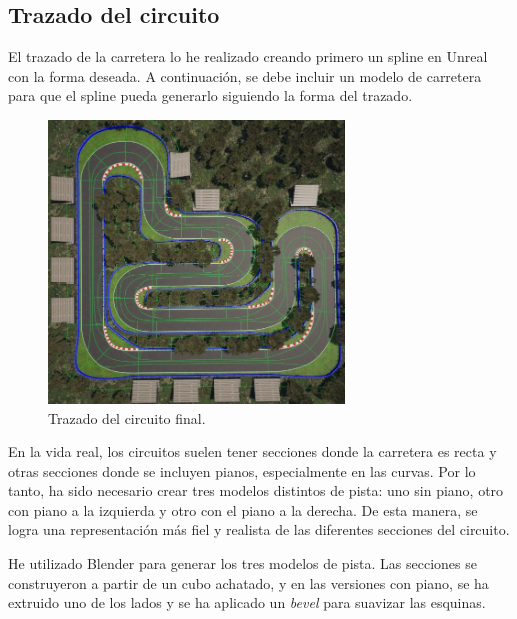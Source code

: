 \subsection{Trazado del circuito}

El trazado de la carretera lo he realizado creando primero un spline en Unreal con la forma deseada. A continuación, se debe incluir un modelo de carretera para que el spline pueda generarlo siguiendo la forma del trazado.
\begin{figure}[H]
    \centering
    \includegraphics[width=0.7\textwidth]{imagenes/converted/trazadoFinal.jpg}
    \caption{Trazado del circuito final.}
    \label{fig:trazado}
\end{figure}


En la vida real, los circuitos suelen tener secciones donde la carretera es recta y otras secciones donde se incluyen pianos, especialmente en las curvas. Por lo tanto, ha sido necesario crear tres modelos distintos de pista: uno sin piano, otro con piano a la izquierda y otro con el piano a la derecha. De esta manera, se logra una representación más fiel y realista de las diferentes secciones del circuito.

\bigskip

He utilizado Blender para generar los tres modelos de pista. Las secciones se construyeron a partir de un cubo achatado, y en las versiones con piano, se ha extruido uno de los lados y se ha aplicado un \textit{bevel} para suavizar las esquinas.

